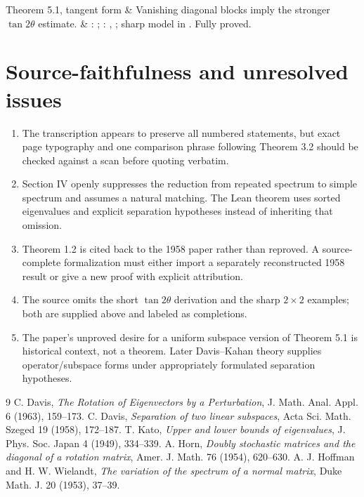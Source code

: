 \begin{formalizationmap}
Theorem 5.1, tangent form & Vanishing diagonal blocks imply the stronger $\tan2\theta$ estimate. & : ; : , ; sharp model in . Fully proved. \\
\end{formalizationmap}

\section{Source-faithfulness and unresolved issues}

\begin{enumerate}[leftmargin=2em]
\item The transcription appears to preserve all numbered statements, but exact page typography and one comparison phrase following Theorem 3.2 should be checked against a scan before quoting verbatim.
\item Section IV openly suppresses the reduction from repeated spectrum to simple spectrum and assumes a natural matching. The Lean theorem uses sorted eigenvalues and explicit separation hypotheses instead of inheriting that omission.
\item Theorem 1.2 is cited back to the 1958 paper rather than reproved. A source-complete formalization must either import a separately reconstructed 1958 result or give a new proof with explicit attribution.
\item The source omits the short $\tan2\theta$ derivation and the sharp $2\times2$ examples; both are supplied above and labeled as completions.
\item The paper's unproved desire for a uniform subspace version of Theorem 5.1 is historical context, not a theorem. Later Davis--Kahan theory supplies operator/subspace forms under appropriately formulated separation hypotheses.
\end{enumerate}

\begin{thebibliography}{9}
 C. Davis, \emph{The Rotation of Eigenvectors by a Perturbation}, J. Math. Anal. Appl. 6 (1963), 159--173.
 C. Davis, \emph{Separation of two linear subspaces}, Acta Sci. Math. Szeged 19 (1958), 172--187.
 T. Kato, \emph{Upper and lower bounds of eigenvalues}, J. Phys. Soc. Japan 4 (1949), 334--339.
 A. Horn, \emph{Doubly stochastic matrices and the diagonal of a rotation matrix}, Amer. J. Math. 76 (1954), 620--630.
 A. J. Hoffman and H. W. Wielandt, \emph{The variation of the spectrum of a normal matrix}, Duke Math. J. 20 (1953), 37--39.
\end{thebibliography}


